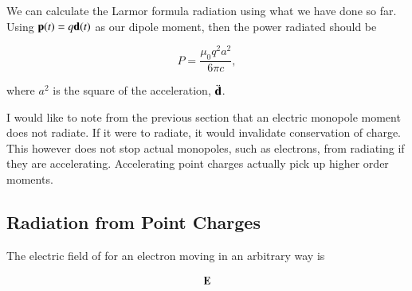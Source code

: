 \documentclass[preprint, review,12pt]{elsarticle}
\def\b{\textbf}
\begin{document}
We can calculate the Larmor formula radiation using what we have done so far. Using $\b p(t) = q \b d(t)$ as our dipole moment, then the power radiated should be 

\begin{equation}
    P = \frac{\mu_0 q^2 a^2}{6 \pi c},
\end{equation}

where $a^2$ is the square of the acceleration, $\ddot{\b d}$.

I would like to note from the previous section that an electric monopole moment does not radiate. If it were to radiate, it would invalidate conservation of charge. This however does not stop actual monopoles, such as electrons, from radiating if they are accelerating. Accelerating point charges actually pick up higher order moments.

\subsection{Radiation from Point Charges}

The electric field of for an electron moving in an arbitrary way is 

\begin{equation}
    \b E
\end{equation}








































\end{document}
